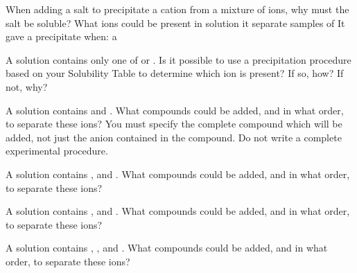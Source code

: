 \documentclass[fleqn]{exam}
\begin{document}
\begin{questions}

  \setcounter{question}{25}


  \question When adding a salt to precipitate a cation from a mixture of ions, why must the salt be soluble?
  \vspace{1.5in}
  \question What ions could be present in solution it separate samples of It gave a precipitate when: a

  \question A solution contains only one of  or . Is it possible to use a precipitation procedure based on your Solubility Table to determine which ion is present? If so, how? If not, why?
  \vspace{1.5in}

  \question A solution contains  and . What compounds could be added, and in what order, to separate these ions? You must specify the complete compound which will be added, not just the anion contained in the compound. Do not write a complete experimental procedure.
  \vspace{1.5in}

  \question A solution contains ,  and . What compounds could be added, and in what order, to separate these ions?
  \vspace{1.5in}

  \question A solution contains ,  and . What compounds could be added, and in what order, to separate these ions?
  \vspace{1.5in}

  \question A solution contains , ,  and . What compounds could be added, and in what order, to separate these ions?
  \vspace{1.5in}


\end{questions}
\end{document}
